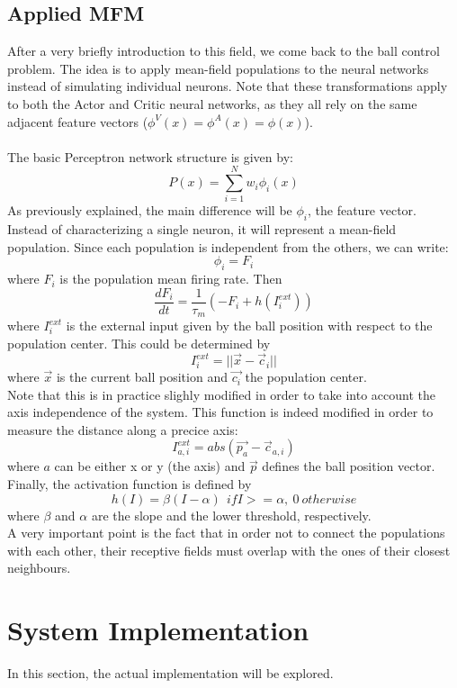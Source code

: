 \documentclass{article}
\begin{document}
\subsection{Applied MFM}
After a very briefly introduction to this field, we come back to the ball control problem. The idea is to apply mean-field populations to the neural networks instead of simulating individual neurons. Note that these transformations apply to both the Actor and Critic neural networks, as they all rely on the same adjacent feature vectors (\(\phi^{V}(x) = \phi^{A}(x) = \phi(x)\)).\\ \\
The basic Perceptron network structure is given by:
\[
P(x) = \sum_{i=1}^{N}{w_{i}\phi_{i}(x)}
\]
As previously explained, the main difference will be \(\phi_{i}\), the feature vector. Instead of characterizing a single neuron, it will represent a mean-field population. Since each population is independent from the others, we can write:
\[
\phi_{i} = F_{i}
\]
where \(F_{i}\) is the population mean firing rate. Then
\[
\frac{dF_{i}}{dt} = \frac{1}{\tau_{m}}(-F_{i} + h(I_{i}^{ext}))
\]
where \(I_{i}^{ext}\) is the external input given by the ball position with respect to the population center. This could be determined by
\[
I_{i}^{ext} = ||\vec{x} - \vec{c}_{i}||
\]
where \(\vec{x}\) is the current ball position and \(\vec{c_{i}}\) the population center. \\
Note that this is in practice slighly modified in order to take into account the axis independence of the system. This function is indeed modified in order to measure the distance along a precice axis:
\[
I_{a,i}^{ext} = abs(\vec{p_{a}} - \vec{c}_{a,i})
\]
where \(a\) can be either x or y (the axis) and \(\vec{p}\) defines the ball position vector.\\

Finally, the activation function is defined by
\[ 
h(I) = \beta(I - \alpha)	\:\: if I >= \alpha, \:0\: otherwise
\]
where \(\beta\) and \(\alpha\) are the slope and the lower threshold, respectively. \\
A very important point is the fact that in order not to connect the populations with each other, their receptive fields must overlap with the ones of their closest neighbours.


\section{System Implementation}
In this section, the actual implementation will be explored.
\end{document}
